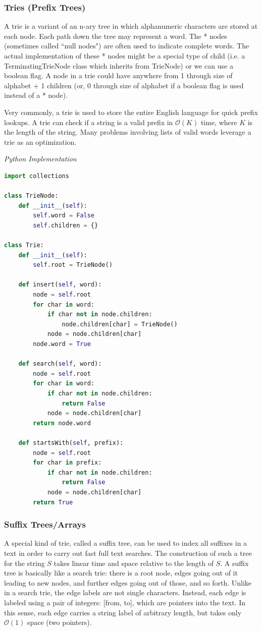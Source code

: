 \documentclass{article}
\newcommand{\bigO}{\mathcal{O}}
\begin{document}
    \subsubsection{Tries (Prefix Trees)}
    A trie is a variant of an n-ary tree in which alphanumeric characters are stored at each node. Each path down the tree may represent a word. The * nodes (sometimes called ``null nodes") are often used to indicate complete words. The actual implementation of these * nodes might be a special type of child (i.e. a TerminatingTrieNode class which inherits from TrieNode) or we can use a boolean flag. A node in a trie could have anywhere from 1 through size of alphabet + 1 children (or, 0 through size of alphabet if a boolean flag is used instead of a * node). 
    
    Very commonly, a trie is used to store the entire English language for quick prefix lookups. A trie can check if a string is a valid prefix in $\bigO(K)$ time, where $K$ is the length of the string. Many problems involving lists of valid words leverage a trie as an optimization.
    
\vspace{8pt} \emph{Python Implementation}
\begin{lstlisting}[language=Python]
import collections

class TrieNode:
    def __init__(self):
        self.word = False
        self.children = {}

class Trie:
    def __init__(self):
        self.root = TrieNode()

    def insert(self, word):
        node = self.root
        for char in word:
            if char not in node.children:
                node.children[char] = TrieNode()
            node = node.children[char]
        node.word = True

    def search(self, word):
        node = self.root
        for char in word:
            if char not in node.children:
                return False
            node = node.children[char]
        return node.word

    def startsWith(self, prefix):
        node = self.root
        for char in prefix:
            if char not in node.children:
                return False
            node = node.children[char]
        return True
\end{lstlisting}

    \subsubsection{Suffix Trees/Arrays}
    A special kind of trie, called a suffix tree, can be used to index all suffixes in a text in order to carry out fast full text searches. The construction of such a tree for the string $S$ takes linear time and space relative to the length of $S$. A suffix tree is basically like a search trie: there is a root node, edges going out of it leading to new nodes, and further edges going out of those, and so forth. Unlike in a search trie, the edge labels are not single characters. Instead, each edge is labeled using a pair of integers: [from, to], which are pointers into the text. In this sense, each edge carries a string label of arbitrary length, but takes only $\bigO(1)$ space (two pointers).
    
\end{document}
